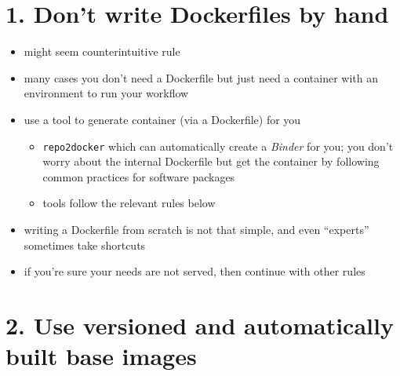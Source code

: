 \documentclass[10pt,letterpaper]{article}
\providecommand{\tightlist}{%
  \setlength{\itemsep}{0pt}\setlength{\parskip}{0pt}}
\begin{document}
\hypertarget{dont-write-dockerfiles-by-hand}{%
\section*{1. Don't write Dockerfiles by
hand}\label{dont-write-dockerfiles-by-hand}}

\begin{itemize}
\tightlist
\item
  might seem counterintuitive rule
\item
  many cases you don't need a Dockerfile but just need a container with
  an environment to run your workflow
\item
  use a tool to generate container (via a Dockerfile) for you

  \begin{itemize}
  \tightlist
  \item
    \texttt{repo2docker} which can automatically create a \emph{Binder}
    for you; you don't worry about the internal Dockerfile but get the
    container by following common practices for software packages
  \item
    tools follow the relevant rules below
  \end{itemize}
\item
  writing a Dockerfile from scratch is not that simple, and even
  ``experts'' sometimes take shortcuts
\item
  if you're sure your needs are not served, then continue with other
  rules
\end{itemize}

\hypertarget{use-versioned-and-automatically-built-base-images}{%
\section*{2. Use versioned and automatically built base
images}\label{use-versioned-and-automatically-built-base-images}}
\end{document}
